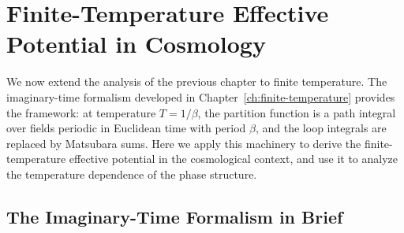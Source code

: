 \chapter{Finite-Temperature Effective Potential in Cosmology}
\label{ch:fT-eff-pot-cosmo}

We now extend the analysis of the previous chapter to finite temperature.
The imaginary-time formalism developed in Chapter~\ref{ch:finite-temperature}
provides the framework: at temperature $T = 1/\beta$, the partition
function is a path integral over fields periodic in Euclidean time with
period $\beta$, and the loop integrals are replaced by Matsubara sums.
Here we apply this machinery to derive the finite-temperature effective
potential in the cosmological context, and use it to analyze the
temperature dependence of the phase structure.

\section{The Imaginary-Time Formalism in Brief}

